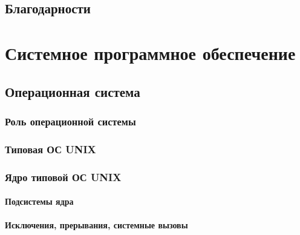 \documentclass[oneside]{book}
\begin{document}
\cleardoublepage\clearpage




\chapter*{Благодарности}



\tableofcontents


\part{Системное программное обеспечение}
%

	\chapter{Операционная система}
	
			
		\section{Роль операционной системы}
		
	
		\section{Типовая ОС UNIX}
		
	
		\section{Ядро типовой ОС UNIX}
		
		
			\subsection{Подсистемы ядра}
			
		
			\subsection{Исключения, прерывания, системные вызовы}
			
			
\end{document}
